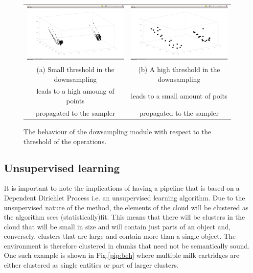 \documentclass[twoside,hidelinks]{article}
\begin{document}
\begin{figure}[!ht]
\begin{tabular}{cc}
    \includegraphics[width=.4\textwidth]{smalldownsamplinglimit} &  \includegraphics[width=.4\textwidth]{largedownsamplinglimit} \\
    (a) Small threshold in the downsampling  & (b) A high threshold in the downsampling  \\
        leads to  a high amoung of points    &     leads to a small amount of poits \\
        propagated to the sampler            &     propagated to the sampler  \\[6pt]
\end{tabular}
\caption{The behaviour of the dowsampling module with respect to the threshold of the operations.}
  \label{pip:downsample}
\end{figure}
  
\subsection{Unsupervised learning}


It is important to note the implications of having a pipeline that is based on a Dependent Dirichlet Process i.e. an unsupervised learning algorithm. Due to the unsupervised nature of the method, the elements of the cloud will be clustered as the algorithm sees (statistically)fit. This means that there will be clusters in the cloud that will be small in size and will contain just parts of an object and, conversely, clusters that are large and contain more than a single object. The environment is therefore clustered in chunks that need not be semantically sound. One such example is shown in Fig.\ref{pip:beh} where multiple milk cartridges are either clustered as single entities or part of larger clusters.
\end{document}
